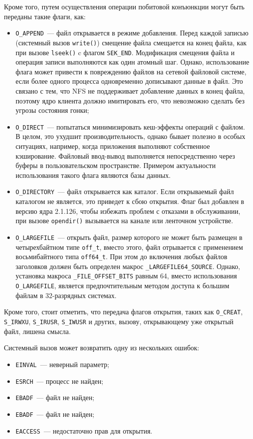 Кроме того, путем осуществления операции побитовой конъюнкции могут быть
переданы такие флаги, как:
\begin{itemize}
\item \texttt{O\_APPEND}~--- файл открывается в режиме добавления. Перед каждой
  записью (системный вызов \texttt{write()}) смещение файла смещается на конец
  файла, как при вызове \texttt{lseek()} c флагом \texttt{SEK\_END}. Модификация
  смещения файла и операция записи выполняются как один атомный шаг. Однако,
  использование флага может привести к повреждению файлов на сетевой файловой
  системе, если более одного процесса одновременно дописывают данные в файл. Это
  связано с тем, что NFS не поддерживает добавление данных в конец файла,
  поэтому ядро клиента должно имитировать его, что невозможно сделать без угрозы
  состояния гонки;
\item \texttt{O\_DIRECT}~--- попытаться минимизировать кеш-эффекты операций с
  файлом. В целом, это ухудшит производительность, однако бывает полезно в
  особых ситуациях, например, когда приложения выполняют собственное
  кэширование. Файловый ввод-вывод выполняется непосредственно через буферы в
  пользовательском пространстве. Примером актуальности использования такого флага
  являются базы данных.
\item \texttt{O\_DIRECTORY}~--- файл открывается как каталог. Если открываемый
  файл каталогом не является, это приведет к сбою открытия. Флаг был добавлен в
  версию ядра 2.1.126, чтобы избежать проблем с отказами в обслуживании, при
  вызове \texttt{opendir()} вызывается на канале или ленточном устройстве.
\item \texttt{O\_LARGEFILE}~--- открыть файл, размер которого не может быть
  размещен в четырехбайтном типе \texttt{off\_t}, вместо этого, файл отрывается с
  применением восьмибайтного типа \texttt{off64\_t}. При этом до включения любых
  файлов заголовков должен быть определен макрос \texttt{\_LARGEFILE64\_SOURCE}.
  Однако, установка макроса \texttt{\_FILE\_OFFSET\_BITS} равным 64, вместо
  использования \texttt{O\_LARGEFILE}, является предпочтительным методом доступа
  к большим файлам в 32-разрядных системах.
\end{itemize}

Кроме того, стоит отметить, что передача флагов открытия, таких как
\texttt{O\_CREAT}, \texttt{S\_IRWXU}, \texttt{S\_IRUSR}, \texttt{S\_IWUSR} и
других, вызову, открывающему уже открытый файл, лишена смысла.

Системный вызов может возвратить одну из нескольких ошибок:
\begin{itemize}
\item \texttt{EINVAL}~--- неверный параметр;
\item \texttt{ESRCH}~--- процесс не найден;
\item \texttt{EBADF}~--- файл не найден;
\item \texttt{EBADF}~--- файл не найден;
\item \texttt{EACCESS}~--- недостаточно прав для открытия.
\end{itemize}

